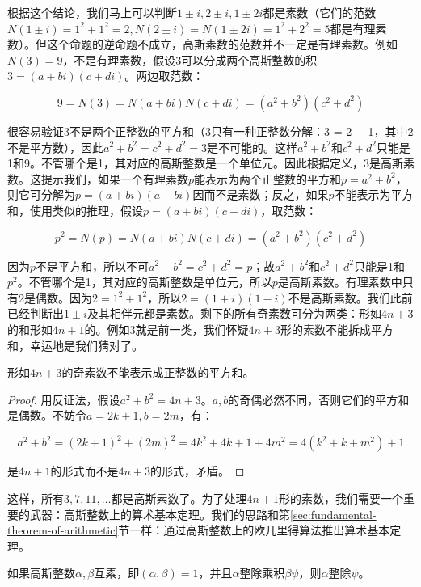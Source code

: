 \documentclass[b5paper]{ctexart}
\begin{document}
根据这个结论，我们马上可以判断$1 \pm i, 2 \pm i, 1 \pm 2i$都是素数（它们的范数$N(1 \pm i) = 1^2 + 1^2 = 2, N(2 \pm i) = N(1 \pm 2i) = 1^2 + 2^2 = 5$都是有理素数）。但这个命题的逆命题不成立，高斯素数的范数并不一定是有理素数。例如$N(3) = 9$，不是有理素数，假设3可以分成两个高斯整数的积$3 = (a + bi)(c + di)$。两边取范数：

\[
9 = N(3) = N(a + bi)N(c + di) = (a^2 + b^2)(c^2 + d^2)
\]

很容易验证3不是两个正整数的平方和（3只有一种正整数分解：3 = 2 + 1，其中2不是平方数），因此$a^2 + b^2 = c^2 + d^2 = 3$是不可能的。这样$a^2 + b^2$和$c^2 + d^2$只能是1和9。不管哪个是1，其对应的高斯整数是一个单位元。因此根据定义，3是高斯素数。这提示我们，如果一个有理素数$p$能表示为两个正整数的平方和$p = a^2 + b^2$，则它可分解为$p = (a + bi)(a - bi)$因而不是素数；反之，如果$p$不能表示为平方和，使用类似的推理，假设$p = (a + bi)(c + di)$，取范数：

\[
p^2 = N(p) = N(a + bi)N(c + di) = (a^2 + b^2)(c^2 + d^2)
\]

因为$p$不是平方和，所以不可$a^2 + b^2 = c^2 + d^2 = p$；故$a^2 + b^2$和$c^2 + d^2$只能是1和$p^2$。不管哪个是1，其对应的高斯整数是单位元，所以$p$是高斯素数。有理素数中只有2是偶数。因为$2 = 1^2 + 1^2$，所以$2 = (1 + i)(1 - i)$不是高斯素数。我们此前已经判断出$1 \pm i$及其相伴元都是素数。剩下的所有奇素数可分为两类：形如$4n + 3$的和形如$4n + 1$的。例如3就是前一类，我们怀疑$4n + 3$形的素数不能拆成平方和，幸运地是我们猜对了。

\begin{proposition}
形如$4n + 3$的奇素数不能表示成正整数的平方和。
\end{proposition}

\begin{proof}
用反证法，假设$a^2 + b^2 = 4n + 3$。$a, b$的奇偶必然不同，否则它们的平方和是偶数。不妨令$a = 2k + 1, b = 2m$，有：

\[
a^2 + b^2 = (2k + 1)^2 + (2m)^2 = 4k^2 + 4k + 1 + 4m^2 = 4(k^2 + k + m^2) + 1
\]

是$4n + 1$的形式而不是$4n + 3$的形式，矛盾。
\end{proof}

这样，所有$3, 7, 11, \dotsc$都是高斯素数了。为了处理$4n + 1$形的素数，我们需要一个重要的武器：高斯整数上的算术基本定理。我们的思路和第\ref{sec:fundamental-theorem-of-arithmetic}节一样：通过高斯整数上的欧几里得算法推出算术基本定理。

\begin{proposition}
如果高斯整数$\alpha, \beta$互素，即$(\alpha, \beta) = 1$，并且$\alpha$整除乘积$\beta \psi$，则$\alpha$整除$\psi$。
\end{proposition}
\end{document}
